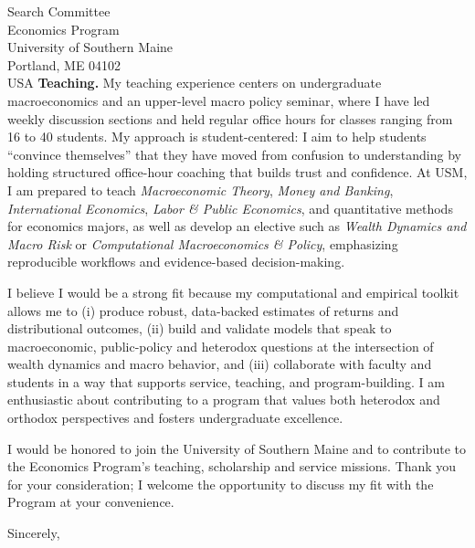\documentclass[11pt,letterpaper]{letter}
\begin{document}
\begin{letter}{Search Committee \\
Economics Program \\
University of Southern Maine \\
Portland, ME 04102 \\ USA}
\textbf{Teaching.} My teaching experience centers on undergraduate macroeconomics and an upper-level macro policy seminar, where I have led weekly discussion sections and held regular office hours for classes ranging from 16 to 40 students. My approach is student-centered: I aim to help students “convince themselves” that they have moved from confusion to understanding by holding structured office-hour coaching that builds trust and confidence. At USM, I am prepared to teach \textit{Macroeconomic Theory}, \textit{Money and Banking}, \textit{International Economics}, \textit{Labor \& Public Economics}, and quantitative methods for economics majors, as well as develop an elective such as \textit{Wealth Dynamics and Macro Risk} or \textit{Computational Macroeconomics \& Policy}, emphasizing reproducible workflows and evidence-based decision-making.

I believe I would be a strong fit because my computational and empirical toolkit allows me to (i) produce robust, data-backed estimates of returns and distributional outcomes, (ii) build and validate models that speak to macroeconomic, public-policy and heterodox questions at the intersection of wealth dynamics and macro behavior, and (iii) collaborate with faculty and students in a way that supports service, teaching, and program-building. I am enthusiastic about contributing to a program that values both heterodox and orthodox perspectives and fosters undergraduate excellence.

I would be honored to join the University of Southern Maine and to contribute to the Economics Program’s teaching, scholarship and service missions. Thank you for your consideration; I welcome the opportunity to discuss my fit with the Program at your convenience.

\closing{Sincerely,}

\end{letter}
\end{document}
